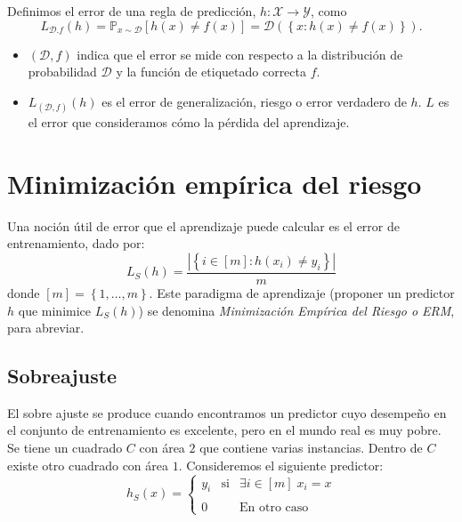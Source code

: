 \begin{itemize}
	Definimos el error de una regla de predicción, $h:\mathcal{X}\to \mathcal{Y}$, como
	\begin{equation}
	    L_{\mathcal{D}.f}(h) = \mathbb{P}_{x\sim \mathcal{D}} \left[h(x)\neq f(x)\right] = \mathcal{D}\left(\left\{x:h(x)\neq f(x)\right\}\right).
	\end{equation}
	\begin{itemize}
	    \item $(\mathcal{D},f)$ indica que el error se mide con respecto a la distribución de probabilidad $\mathcal{D}$ y la función de etiquetado correcta $f$.
	    \item $L_{(\mathcal{D},f)}(h)$ es el error de generalización, riesgo o error verdadero de $h$. $L$ es el error que consideramos cómo la pérdida del aprendizaje. 
	\end{itemize}
\end{itemize}

\section{Minimización empírica del riesgo}

Una noción útil de error que el aprendizaje puede calcular es el error de entrenamiento, dado por:
\begin{equation}
    L_S(h) = \dfrac{|\left\{i\in [m]: h(x_i)\neq y_i\right\}|}{m}
\end{equation}
donde $[m]= \left\{1,\ldots,m\right\}.$
Este paradigma de aprendizaje (proponer un predictor $h$ que minimice $L_S(h)$) se denomina \textit{Minimización Empírica del Riesgo o ERM}, para abreviar.

\subsection{Sobreajuste}
El sobre ajuste se produce cuando encontramos un predictor cuyo desempeño en el conjunto de entrenamiento es excelente, pero en el mundo real es muy pobre. \\

Se tiene un cuadrado $C$ con área $2$ que contiene varias instancias. Dentro de $C$ existe otro cuadrado con área $1$. Consideremos el siguiente predictor:
\begin{equation}
    h_S(x) = \left\{\begin{array}{rcl}
	y_i & \text{si} & \exists i \in [m]\; x_i=x\\\\
	0 & & \text{En otro caso}
    \end{array}\right.
\end{equation}

